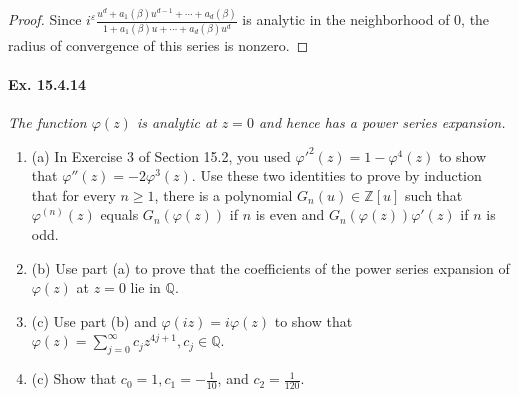 \documentclass[11pt,a4paper]{article}
\newcommand{\be} {\begin{enumerate}}
\newcommand{\ee} {\end{enumerate}}
\newcommand{\Q}{\mathbb{Q}}
\newcommand{\Z}{\mathbb{Z}}
\begin{document}
\begin{proof}
Since  $i^\varepsilon \frac{u^d + a_1(\beta)u^{d-1}+ \cdots + a_d(\beta)}{1 + a_1(\beta) u + \cdots + a_d(\beta) u^d}$ is analytic in the neighborhood of $0$, the radius of convergence of this series is nonzero.                                                                                                                                                                                                                                                                                                                                                                                                                                                                
\end{proof}


\paragraph{Ex. 15.4.14}{\it  The function $\varphi(z)$ is analytic at $z=0$ and hence has a power series expansion.
\be
\item[(a)] In Exercise 3 of Section 15.2, you used $\varphi'^2(z) = 1 - \varphi^4(z)$ to show that $\varphi''(z) = -2 \varphi^3(z)$. Use these two identities to prove by induction that for every $n\geq 1$, there is a polynomial $G_n(u) \in \Z[u]$ such that $\varphi^{(n)}(z)$ equals $G_n(\varphi(z))$ if $n$ is even and $G_n(\varphi(z)) \varphi'(z)$ if $n$ is odd.
\item[(b)] Use part (a) to prove that the coefficients of the power series expansion of $\varphi(z)$ at $z=0$ lie in $\Q$.
\item[(c)] Use part (b) and $\varphi(iz) = i \varphi(z)$ to show that $\varphi(z) = \sum_{j=0}^\infty c_j z^{4j+1}, c_j \in \Q$.
\item[(c)] Show that $c_0 = 1, c_1 = -\frac{1}{10}$, and $c_2 = \frac{1}{120}$.
\ee
}
\end{document}
